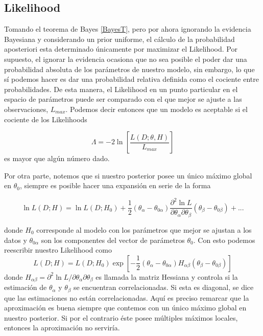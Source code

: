 \documentclass[10.5pt,prb,
               showpacs,            %
               preprintnumbers,     %
               aps,                 %
               prl,          	    %
               letterpaper,             %
               superscriptaddress,      %
               nofootinbib,         %
               tightenlines,        %
               floats,floatfix      %
               ,usenatbib]{revtex4-1}%
\begin{document}
\subsection{Likelihood}

Tomando el teorema de Bayes \eqref{BayesT}, pero por ahora ignorando la evidencia Bayesiana y considerando 
un prior uniforme, el c\'alculo de la probabilidad aposteriori esta determinado \'unicamente por maximizar el Likelihood. 
Por supuesto, el ignorar la evidencia ocasiona que no sea posible el poder dar una probabilidad absoluta 
de los par\'ametros de nuestro modelo, sin embargo, lo que s\'i podemos hacer es dar una probabilidad relativa 
definida como el cociente entre probabilidades. De esta manera, el Likelihood en un punto particular en el espacio 
de par\'ametros puede ser comparado con el que mejor se ajuste a las observaciones, $L_{max}$. Podemos decir 
entonces que un modelo es aceptable si el cociente de los Likelihoods

	\begin{equation}
		\Lambda=-2\ln\left[\frac{L(D;\theta,H)}{L_{max}}\right]
	\end{equation}
es mayor que alg\'un n\'umero dado.

Por otra parte, notemos que si nuestro posterior posee un \'unico m\'aximo global en $\theta_0$, 
siempre es posible hacer una expansi\'on en serie de la forma

	\begin{equation}
		\ln L(D;H)=\ln L(D;H_0)+\frac{1}{2}(\theta_\alpha-\theta_{0\alpha})\frac{\partial^2\ln L}
			{\partial\theta_\alpha \partial\theta_\beta}(\theta_\beta-\theta_{0\beta})+...
	\end{equation}

\noindent
donde $H_0$ corresponde al modelo con los par\'ametros que mejor se ajustan a los datos y 
$\theta_{0\alpha}$ son los componentes del vector de par\'ametros $\theta_0$.
Con esto podemos reescribir nuestro Likelihood como
%	
	\begin{equation}\label{GLik}
		L(D;H)=L(D;H_0)\exp \left[-\frac{1}{2}(\theta_\alpha-\theta_{0\alpha})H_{\alpha\beta}(\theta_\beta-\theta_{0\beta})\right]
	\end{equation}
%
donde
%
$		H_{\alpha\beta}=\partial^2\ln L/ \partial\theta_\alpha \partial\theta_\beta$
%
es llamada la matriz Hessiana y controla si la estimaci\'on de $\theta_\alpha$ y $\theta_\beta$ 
se encuentran correlacionadas. Si esta es diagonal, se dice que las estimaciones no est\'an correlacionadas.
%
Aqu\'i es preciso remarcar que la aproximaci\'on es buena siempre que contemos con un \'unico m\'aximo 
global en nuestro posterior. Si por el contrario \'este posee m\'ultiples m\'aximos locales, entonces la aproximaci\'on no servir\'ia.
\end{document}
